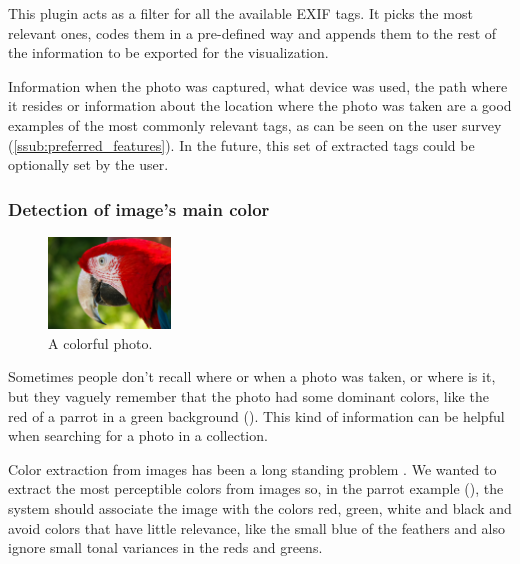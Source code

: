 This plugin acts as a filter for all the available \ac{EXIF} tags. It picks the most relevant ones, codes them in a pre-defined way and appends them to the rest of the information to be exported for the visualization.

Information when the photo was captured, what device was used, the path where it resides or information about the location where the photo was taken are a good examples of the most commonly relevant tags, as can be seen on the user survey (\ref{ssub:preferred_features}). In the future, this set of extracted tags could be optionally set by the user.


\subsubsection{Detection of image’s main color}

\begin{figure}
	\vspace{-20pt}
	\begin{center}
		\includegraphics[width=0.29\textwidth]{Figures/parrot}
	\end{center}
	\vspace{-20pt}
	\caption{A colorful photo.}
	\vspace{-5pt}
	\label{fig:parrot}
\end{figure}

Sometimes people don’t recall where or when a photo was taken, or where is it, but they vaguely remember that the photo had some dominant colors, like the red of a parrot in a green background (). This kind of information can be helpful when searching for a photo in a collection.

Color extraction from images has been a long standing problem \cite{Wan:2011bg,Strong:2009p413,Gabbouj:2009en,Girgensohn:2009:MOP:1502650.1502711,Zaheer:2010p3735,Datta:2008p1604,Chang:2007bt}. We wanted to extract the most perceptible colors from images so, in the parrot example (), the system should associate the image with the colors red, green, white and black and avoid colors that have little relevance, like the small blue of  the feathers and also ignore small tonal variances in the reds and greens.

